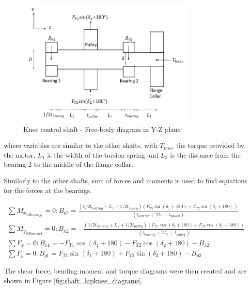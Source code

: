 \begin{figure}
    \centering
    \includegraphics[width=0.8\textwidth]{4_Analysis/img/Shafts/ShaftHipKneeYZ.JPG}
    \caption{Knee control shaft - Free-body diagram in Y-Z plane}
    \label{fig:shaft_hipknee_fbd2}
\end{figure}

where variables are similar to the other shafts, with $T_{knee}$ the torque provided by the motor, $L_1$ is the width of the torsion spring and $L_3$ is the distance from the bearing 2 to the middle of the flange collar.

Similarly to the other shafts, sum of forces and moments is used to find equations for the forces at the bearings. 

\begin{gather}
    \sum M_{x_{@Bearing 1}}=0:  B_{y2}=\frac{(1/2 t_{bearing}+L_1+1/2 t_{pulley} )(F_{T1} \sin{(\delta_1+180)}+F_{T2} \sin{(\delta_2+180)})}{(t_{bearing}+2L_1+t_{pulley} )} \label{eq:shaft_kneehip_1}
    \\
    \sum M_{y_{@Bearing 1}}=0:  B_{x2}=-\frac{(1/2 t_{bearing}+L_1+1/2 t_{pulley} )(F_{T1} \cos{(\delta_1+180)}+F_{T2} \cos{(\delta_2+180)})}{(t_{bearing}+2L_1+t_{pulley} )}
    \\
    \sum F_x=0: B_{x1}=-F_{T1}\cos(\delta_1+180)-F_{T2} \cos(\delta_2+180)-B_{x2}
    \\
    \sum F_y=0: B_{y1}=F_{T1}\sin(\delta_1+180)+F_{T2} \sin(\delta_2+180)-B_{y2}
\end{gather}

The shear force, bending moment and torque diagrams were then created and are shown in Figure \ref{fig:shaft_hipknee_diagrams}. 

